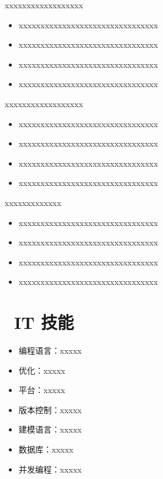 \documentclass{resume}
\begin{document}
\begin{onehalfspacing}
xxxxxxxxxxxxxxxxxx
\begin{itemize}
  \item xxxxxxxxxxxxxxxxxxxxxxxxxxxxxxxx
  \item xxxxxxxxxxxxxxxxxxxxxxxxxxxxxxxx
  \item xxxxxxxxxxxxxxxxxxxxxxxxxxxxxxxx
  \item xxxxxxxxxxxxxxxxxxxxxxxxxxxxxxxx
\end{itemize}
\end{onehalfspacing}

\begin{onehalfspacing}
xxxxxxxxxxxxxxxxxx
\begin{itemize}
  \item xxxxxxxxxxxxxxxxxxxxxxxxxxxxxxxx
  \item xxxxxxxxxxxxxxxxxxxxxxxxxxxxxxxx
  \item xxxxxxxxxxxxxxxxxxxxxxxxxxxxxxxx
  \item xxxxxxxxxxxxxxxxxxxxxxxxxxxxxxxx
\end{itemize}
\end{onehalfspacing}

xxxxxxxxxxxxx
\begin{itemize}
  \item xxxxxxxxxxxxxxxxxxxxxxxxxxxxxxxx
  \item xxxxxxxxxxxxxxxxxxxxxxxxxxxxxxxx
  \item xxxxxxxxxxxxxxxxxxxxxxxxxxxxxxxx
  \item xxxxxxxxxxxxxxxxxxxxxxxxxxxxxxxx
\end{itemize}


\section{\faCogs\ IT 技能}
\begin{itemize}[parsep=0.5ex]
  \item 编程语言：xxxxx
  \item 优化：xxxxx
  \item 平台：xxxxx
  \item 版本控制：xxxxx
  \item 建模语言：xxxxx
  \item 数据库：xxxxx
  \item 并发编程：xxxxx
\end{itemize}
\end{document}
